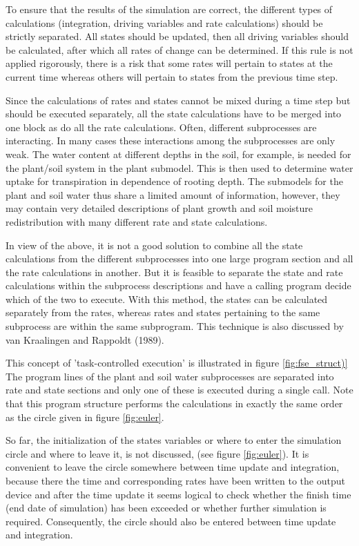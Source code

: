 To ensure that the results of the simulation are correct, the different types of calculations
(integration, driving variables and rate calcula\-tions) should be strictly separated. All states
should be updated, then all driving variables should be calculat\-ed, after which all rates of
change can be determined. If this rule is not applied rigorous\-ly, there is a risk that some
rates will pertain to states at the current time whereas others will pertain to states from
the previous time step.

Since the calculations of rates and states cannot be mixed during a time step but should be
executed separately, all the state calculations have to be merged into one block as do all
the rate calculations. Often, different subprocesses are interacting. In many cases these
interactions among the subprocesses are only weak. The water content at different depths
in the soil, for example, is needed for the plant/soil system in the plant submodel. This is
then used to deter\-mine water uptake for transpiration in dependence of rooting depth. The
submodels for the plant and soil water thus share a limited amount of information,
however, they may contain very detailed descriptions of plant growth and soil moisture
redistribution with many different rate and state calcula\-tions.

In view of the above, it is not a good solution to combine all the state calculations from
the different subprocesses into one large program section and all the rate calculations in
another. But it is feasible to separate the state and rate calculations within the subprocess
descriptions and have a calling program decide which of the two to execute. With this
method, the states can be calculated separately from the rates, whereas rates and states
pertaining to the same subprocess are within the same subprogram. This technique is also
discussed by van Kraalingen and Rappoldt (1989).

This concept of 'task-controlled execution' is illustrated in figure \ref{fig:fse_struct)} The program lines
of the plant and soil water subprocesses are separated into rate and state sections and only
one of these is executed during a single call. Note that this program structure performs
the calculations in exactly the same order as the circle given in figure \ref{fig:euler}.

So far, the initialization of the states variables or where to enter the simula\-tion circle and
where to leave it, is not discussed, (see figure \ref{fig:euler}). It is convenient to leave the circle
somewhere between time update and integration, because there the time and correspond\-ing 
rates have been written to the output device and after the time update it seems logical
to check whether the finish time (end date of simulation) has been exceeded or whether
further simulation is required. Consequently, the circle should also be entered between
time update and integration.

